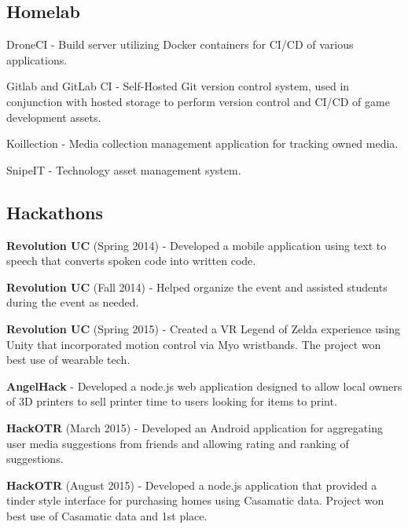 \subsection{{Homelab \hfill}}
\begin{zitemize}
\item DroneCI - Build server utilizing Docker containers for CI/CD of various applications.
\item Gitlab and GitLab CI - Self-Hosted Git version control system, used in conjunction with hosted storage to perform version control and CI/CD of game development assets.
\item Koillection - Media collection management application for tracking owned media.
\item SnipeIT - Technology asset management system.
\end{zitemize}

\subsection{{Hackathons \hfill}}
\begin{zitemize}
\item \textbf{Revolution UC} (Spring 2014) - Developed a mobile application using text to speech that converts spoken code into written code.
\item \textbf{Revolution UC} (Fall 2014) - Helped organize the event and assisted students during the event as needed.
\item \textbf{Revolution UC} (Spring 2015) - Created a VR Legend of Zelda experience using Unity that incorporated motion control via Myo wristbands. The project won best use of wearable tech.
\item \textbf{AngelHack} - Developed a node.js web application designed to allow local owners of 3D printers to sell printer time to users looking for items to print.
\item \textbf{HackOTR} (March 2015) - Developed an Android application for aggregating user media suggestions from friends and allowing rating and ranking of suggestions.
\item \textbf{HackOTR} (August 2015) - Developed a node.js application that provided a tinder style interface for purchasing homes using Casamatic data. Project won best use of Casamatic data and 1st place.
\end{zitemize}



